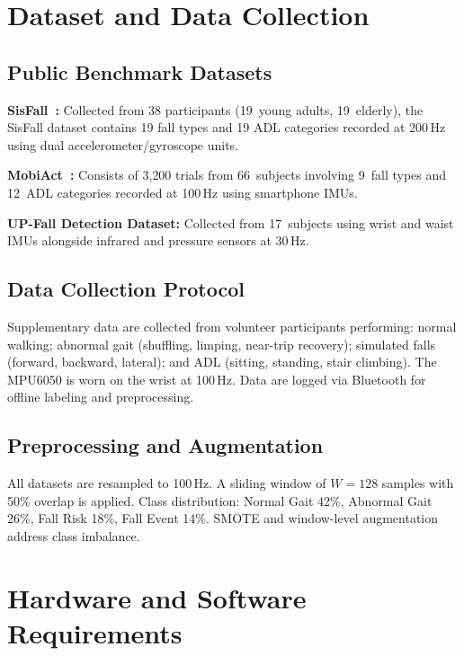 \documentclass[conference]{IEEEtran}
\begin{document}
\section{Dataset and Data Collection}
\label{sec:dataset}

\subsection{Public Benchmark Datasets}

\textbf{SisFall~\cite{sisfall2017}:} Collected from 38 participants
(19~young adults, 19~elderly), the SisFall dataset contains 19 fall types
and 19 ADL categories recorded at 200\,Hz using dual
accelerometer/gyroscope units.

\textbf{MobiAct~\cite{mobiact2020}:} Consists of 3{,}200 trials from
66~subjects involving 9~fall types and 12~ADL categories recorded at
100\,Hz using smartphone IMUs.

\textbf{UP-Fall Detection Dataset:} Collected from 17~subjects using wrist
and waist IMUs alongside infrared and pressure sensors at 30\,Hz.

\subsection{Data Collection Protocol}

Supplementary data are collected from volunteer participants performing:
normal walking; abnormal gait (shuffling, limping, near-trip recovery);
simulated falls (forward, backward, lateral); and ADL (sitting, standing,
stair climbing). The MPU6050 is worn on the wrist at 100\,Hz. Data are
logged via Bluetooth for offline labeling and preprocessing.

\subsection{Preprocessing and Augmentation}

All datasets are resampled to 100\,Hz. A sliding window of $W = 128$
samples with 50\% overlap is applied. Class distribution: Normal Gait 42\%,
Abnormal Gait 26\%, Fall Risk 18\%, Fall Event 14\%. SMOTE and
window-level augmentation address class imbalance.

\section{Hardware and Software Requirements}
\label{sec:hw}
\end{document}

